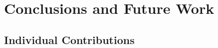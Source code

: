 \documentclass[clean,twocolumn]{bam-project}
\begin{document}
\section{Conclusions and Future Work}
\label{sec:conclusion}




\label{sec:contributions}


\subsection*{Individual Contributions}




\BAMappendices


\end{document}
